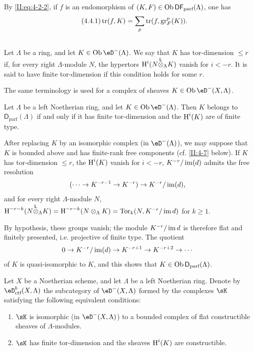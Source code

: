 By \eqref{II:eq:4-2-2}, if $f$ is an endomorphism of
$(K,F)\in\operatorname{Ob}\mathsf{DF}_\text{parf}(\Lambda)$, one has
\begin{equation*}\tag{4.4.1}\label{II:eq:4-4-1}
 \operatorname{tr}(f,K) = \sum_p \operatorname{tr}(f,\operatorname{gr}_F^p(K)) \text{.}
\end{equation*}






\subsection{}\label{II:4-5}

Let $\Lambda$ be a ring, and let $K\in\ob\eD^-(\Lambda)$. We say that $K$
has tor-dimension $\leqslant r$ if, for every right $\Lambda$-module $N$, the
hypertors $\operatorname{H}^i(N{\overset{\mathsf{L}}{\otimes}}_\Lambda K)$ vanish for $i<-r$. It is said to have
finite tor-dimension if this condition holds for some $r$.

The same terminology is used for a complex of sheaves
$K\in\ob\eD^-(X,\Lambda)$.






\begin{lemma}\label{II:4-5-1}
Let $\Lambda$ be a left Noetherian ring, and let
$K\in\ob\eD^-(\Lambda)$. Then $K$ belongs to
$\mathsf{D}_\text{parf}(\Lambda)$ if and only if it has finite tor-dimension
and the $\operatorname{H}^i(K)$ are of finite type.
\end{lemma}

After replacing $K$ by an isomorphic complex (in $\eD^-(\Lambda)$), we may
suppose that $K$ is bounded above and has finite-rank free components (cf.
\ref{II:4-7} below). If $K$ has tor-dimension $\leqslant r$, the
$\operatorname{H}^i(K)$ vanish for $i<-r$, $K^{-r}/\operatorname{im}(d)$ admits the free resolution
\[
  (\cdots \to K^{-r-1} \to K^{-r}) \to K^{-r}/\operatorname{im}(d) \text{,}
\]
and for every right $\Lambda$-module $N$,
$\operatorname{H}^{-r-k}(N{\overset{\mathsf{L}}{\otimes}}_\Lambda K) = \operatorname{H}^{-r-k}(N\otimes_\Lambda K)
= \operatorname{Tor}_k(N,K^{-r}/\operatorname{im} d)$ for $k\geqslant 1$.

By hypothesis, these groups vanish; the module $K^{-r}/\operatorname{im} d$ is therefore
flat and finitely presented, i.e. projective of finite type. The quotient
\[
  0 \to K^{-r}/\operatorname{im}(d) \to K^{-r+1} \to K^{-r+2}\to \cdots
\]
of $K$ is quasi-isomorphic to $K$, and this shows that
$K\in\operatorname{Ob}\mathsf{D}_\text{parf}(\Lambda)$.






\begin{prop-def_}\label{II:4-6}
Let $X$ be a Noetherian scheme, and let $\Lambda$ be a left Noetherian ring.
Denote by $\eD_\textnormal{ctf}^b(X,\Lambda)$ the subcategory of
$\eD^-(X,\Lambda)$ formed by the complexes $\sK$ satisfying the following
equivalent conditions:
\begin{enumerate}[\indent i)]
  \item $\sK$ is isomorphic (in $\eD^-(X,\Lambda)$) to a bounded complex of
    flat constructible sheaves of $\Lambda$-modules.
  \item $\sK$ has finite tor-dimension and the sheaves $\operatorname{H}^i(K)$ are
    constructible.
\end{enumerate}
\end{prop-def_}

